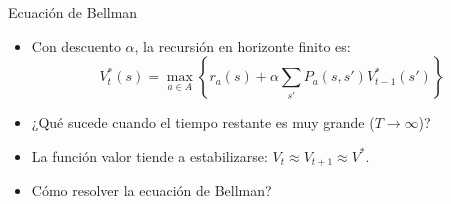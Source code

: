 \documentclass[xcolor=dvipsnames]{beamer}
\begin{document}
\begin{frame}{Ecuaci\'on de Bellman}
\begin{itemize}
\item Con descuento $\alpha$, la recursi\'on en horizonte finito es:
\[ V_t^*(s) = \max_{a \in A} \left\{ r_a(s) + \alpha \sum_{s'} P_a(s,s') V_{t-1}^*(s') \right\} \]
 \item<2-> ¿Qu\'e sucede cuando el tiempo restante es muy grande ($T \to \infty$)?
 \item<3-> La funci\'on valor tiende a estabilizarse: $V_t \approx V_{t+1} \approx V^*$.
\end{itemize}

\begin{itemize}
\item<5-> \textquestiondown C\'omo resolver la ecuaci\'on de Bellman?
\end{itemize}

\end{frame}
\end{document}
